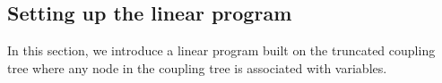 \documentclass[11pt]{article}
\newcommand{\set}[1]{\left\{#1\right\}}
\newcommand{\vecf}{\boldsymbol{f}}
\renewcommand{\Pr}[2][]{ \ifthenelse{\isempty{#1}}
  {\mathbf{Pr}\left[#2\right]} {\mathbf{Pr}_{#1}\left[#2\right]} }
\begin{document}

\subsection{Setting up the linear program}

In this section, we introduce a linear program built on the truncated coupling tree where any node in the coupling tree is associated with variables.
\end{document}
